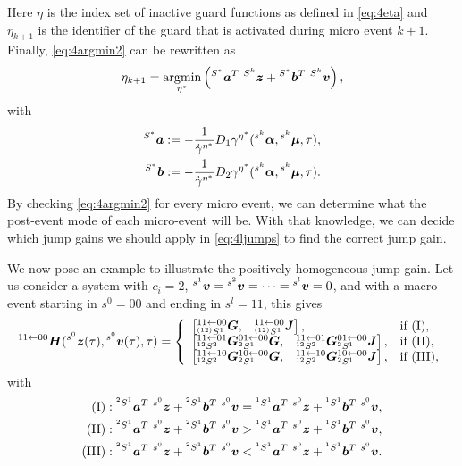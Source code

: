 \documentclass[../DC2017114Bouma.tex]{subfiles}
\begin{document}
Here $\eta$ is the index set of inactive guard functions as defined in \eqref{eq:4eta} and $\eta_{k+1}$ is the identifier of the guard that is activated during micro event $k+1$. Finally, \eqref{eq:4argmin2} can be rewritten as
\begin{align}
\eta_{k+1} = \underset{\eta^*}{\argmin}\left(\ls^{S^\ast}\ab^T\ \ls^{S^k}\zb +\ls^{S^\ast}\bb^T\ \ls^{S^k}\vb\right),
\end{align}
with
\begin{align*}
\hspace{0cm}^{S^\ast}{\boldsymbol{a}} &:= -\frac{1}{\dot{\gamma}^{\eta^\ast}}D_1\gamma^{\eta^\ast}(\hspace{0cm}^{s^k}\boldsymbol{\alpha},\hspace{0cm}^{s^k}\boldsymbol{\mu},\tau),\\
\hspace{0cm}^{S^\ast}{\boldsymbol{b}} &:= -\frac{1}{\dot{\gamma}^{\eta^\ast}}D_2\gamma^{\eta^\ast}(\hspace{0cm}^{s^k}\boldsymbol{\alpha},\hspace{0cm}^{s^k}\boldsymbol{\mu},\tau).
\end{align*}
By checking \eqref{eq:4argmin2} for every micro event, we can determine what the post-event mode of each micro-event will be. With that knowledge, we can decide which jump gains we should apply in \eqref{eq:4ljumps} to find the correct jump gain.

We now pose an example to illustrate the positively homogeneous jump gain. Let us consider a system with $c_i = 2$, $\hspace{0cm}^{s^1}{\boldsymbol{v}}=\hspace{0cm}^{s^2}{\boldsymbol{v}}=\dots=\hspace{0cm}^{s^l}{\boldsymbol{v}}=0$, and with a macro event starting in $s^0 = 00$ and ending in $s^l = 11$, this gives 
\begin{align}
\hspace{0cm}^{11\leftarrow 00}{\boldsymbol{H}}(\hspace{0cm}^{s^0}{\boldsymbol{z}}(\tau),\hspace{0cm}^{s^0}{\boldsymbol{v}}(\tau),\tau) = \left\lbrace\begin{array}{ll}
\begin{bmatrix}\hspace{0cm}^{11\leftarrow 00}_{\hspace{0cm}^{(12)}S^1}{\boldsymbol{G}}, & \hspace{0cm}^{11\leftarrow 00}_{\hspace{0cm}^{(12)}S^1}{\boldsymbol{J}}\end{bmatrix}, & \text{if }(\text{I}),\\
\begin{bmatrix}\hspace{0cm}^{11\leftarrow 01}_{\hspace{0cm}^{12}S^2}{\boldsymbol{G}} \hspace{0cm}^{01\leftarrow 00}_{\hspace{0cm}^{2}S^1}{\boldsymbol{G}}, & \hspace{0cm}^{11\leftarrow 01}_{\hspace{0cm}^{12}S^2}{\boldsymbol{G}} \hspace{0cm}^{01\leftarrow 00}_{\hspace{0cm}^{2}S^1}{\boldsymbol{J}}\end{bmatrix}, & \text{if }(\text{II}),\\
\begin{bmatrix}\hspace{0cm}^{11\leftarrow 10}_{\hspace{0cm}^{12}S^2}{\boldsymbol{G}} \hspace{0cm}^{10\leftarrow 00}_{\hspace{0cm}^{2}S^1}{\boldsymbol{G}}, & \hspace{0cm}^{11\leftarrow 10}_{\hspace{0cm}^{12}S^2}{\boldsymbol{G}} \hspace{0cm}^{10\leftarrow 00}_{\hspace{0cm}^{2}S^1}{\boldsymbol{J}}\end{bmatrix}, & \text{if }(\text{III}),
\end{array}\right.\label{eq:4H2200}
\end{align}
with
\begin{align}
(\text{I})&:\ls^{^2 S^1}\ab^T\ \ls^{s^0}\zb +\ls^{^2 S^1}\bb^T\ \ls^{s^0}\vb = \ls^{^1 S^1}\ab^T\ \ls^{s^0}\zb +\ls^{^1 S^1}\bb^T\ \ls^{s^0}\vb,\nonumber\\
(\text{II})&:\ls^{^2 S^1}\ab^T\ \ls^{s^0}\zb +\ls^{^2 S^1}\bb^T\ \ls^{s^0}\vb > \ls^{^1 S^1}\ab^T\ \ls^{s^0}\zb +\ls^{^1 S^1}\bb^T\ \ls^{s^0}\vb,\label{eq:4conds}\\
(\text{III})&:\ls^{^2 S^1}\ab^T\ \ls^{s^0}\zb +\ls^{^2 S^1}\bb^T\ \ls^{s^0}\vb < \ls^{^1 S^1}\ab^T\ \ls^{s^0}\zb +\ls^{^1 S^1}\bb^T\ \ls^{s^0}\vb.\nonumber
\end{align}
\end{document}
